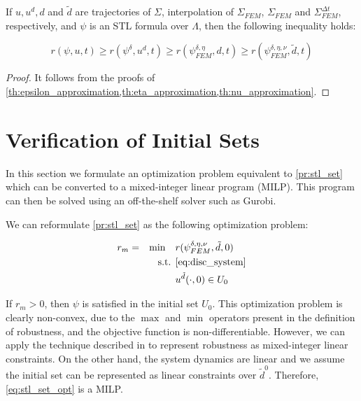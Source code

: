 \documentclass[oribibl]{llncs/llncs}
\begin{document}
\begin{theorem}
    \label{th:robustness}
    If $u, u^d, d$ and $\tilde{d}$ are trajectories of $\Sigma$, interpolation
    of $\Sigma_{FEM}$, $\Sigma_{FEM}$ and $\Sigma_{FEM}^{\Delta t}$,
    respectively, and $\psi$ is an STL formula over $\Lambda$, then the 
    following inequality holds:

    \begin{equation}
        r(\psi, u, t) \geq r(\psi^{\delta}, u^d, t) \geq r(\psi^{\delta,
        \eta}_{FEM}, d, t) \geq r(\psi^{\delta, \eta, \nu}_{FEM}, \tilde{d}, t)
    \end{equation}
\end{theorem}
\begin{proof}
    It follows from the proofs of
    \cref{th:epsilon_approximation,th:eta_approximation,th:nu_approximation}.
\end{proof}

\section{Verification of Initial Sets}
\label{sec:verification_of_initial_sets}

In this section we formulate an optimization problem equivalent to
\cref{pr:stl_set} which can be converted to a mixed-integer linear program
(MILP). This program can then be solved using an off-the-shelf solver such 
as Gurobi.

We can reformulate \cref{pr:stl_set} as the following optimization problem:

\begin{equation}
    \label{eq:stl_set_opt}
    \begin{aligned}
        &r_m = &\min \quad &r(\psi^{\delta, \eta, \nu}_{FEM}, \tilde{d}, 0) \\
        &  &\text{s.t. } &\cref{eq:disc_system} \\
        &  & &u^{\tilde{d}}(\cdot, 0) \in U_0
    \end{aligned}
\end{equation}

If $r_m > 0$, then $\psi$ is satisfied in the initial set $U_0$. This
optimization problem is clearly non-convex, due to the $\max$ and $\min$
operators present in the definition of robustness, and the objective function is
non-differentiable. However, we can apply the technique described in \cite{} to
represent robustness as mixed-integer linear constraints. On the other hand, the
system dynamics are linear and we assume the initial set can be represented as
linear constraints over $\tilde{d}^0$. Therefore, \cref{eq:stl_set_opt} is a
MILP.
\end{document}
